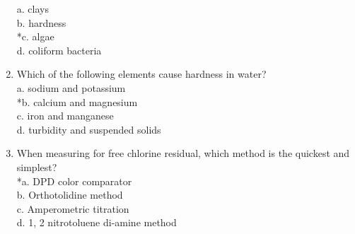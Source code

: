 \begin{enumerate}[1.]
a. clays\\
b. hardness\\
*c. algae\\
d. coliform bacteria\\
\item Which of the following elements cause hardness in water?\\
a. sodium and potassium\\
*b. calcium and magnesium\\
c. iron and manganese\\
d. turbidity and suspended solids\\
\item When measuring for free chlorine residual, which method is the quickest and simplest?\\
*a. DPD color comparator\\
b. Orthotolidine method\\
c. Amperometric titration\\
d. 1, 2 nitrotoluene di-amine method\\
\end{enumerate}
\newpage

